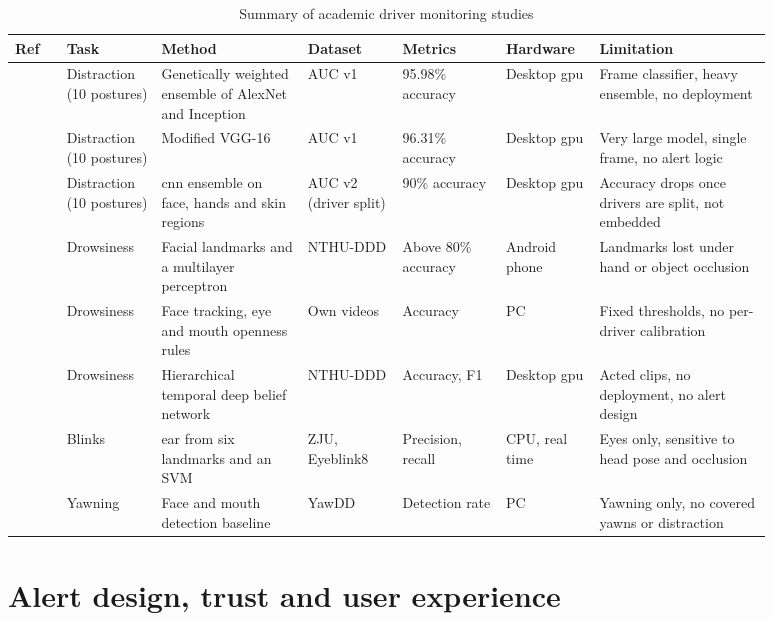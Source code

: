 \begin{table}[htbp]
\centering
\caption{Summary of academic driver monitoring studies}
\label{tab:ch2-01}
\footnotesize
\setlength{\tabcolsep}{3pt}
\renewcommand{\arraystretch}{1.15}
\begin{tabular}{|p{0.060\linewidth}|p{0.110\linewidth}|p{0.170\linewidth}|p{0.115\linewidth}|p{0.120\linewidth}|p{0.105\linewidth}|p{0.205\linewidth}|}
\hline
\textbf{Ref} & \textbf{Task} & \textbf{Method} & \textbf{Dataset} & \textbf{Metrics} & \textbf{Hardware} & \textbf{Limitation} \\
\hline
\cite{r32} & Distraction (10 postures) & Genetically weighted ensemble of AlexNet and Inception & AUC v1 & 95.98\% accuracy & Desktop \gls{gpu} & Frame classifier, heavy ensemble, no deployment \\
\hline
\cite{r34} & Distraction (10 postures) & Modified VGG-16 & AUC v1 & 96.31\% accuracy & Desktop \gls{gpu} & Very large model, single frame, no alert logic \\
\hline
\cite{r33} & Distraction (10 postures) & \gls{cnn} ensemble on face, hands and skin regions & AUC v2 (driver split) & 90\% accuracy & Desktop \gls{gpu} & Accuracy drops once drivers are split, not embedded \\
\hline
\cite{r40} & Drowsiness & Facial landmarks and a multilayer perceptron & NTHU-DDD & Above 80\% accuracy & Android phone & Landmarks lost under hand or object occlusion \\
\hline
\cite{r41} & Drowsiness & Face tracking, eye and mouth openness rules & Own videos & Accuracy & PC & Fixed thresholds, no per-driver calibration \\
\hline
\cite{r37} & Drowsiness & Hierarchical temporal deep belief network & NTHU-DDD & Accuracy, F1 & Desktop \gls{gpu} & Acted clips, no deployment, no alert design \\
\hline
\cite{r35} & Blinks & \gls{ear} from six landmarks and an SVM & ZJU, Eyeblink8 & Precision, recall & CPU, real time & Eyes only, sensitive to head pose and occlusion \\
\hline
\cite{r36} & Yawning & Face and mouth detection baseline & YawDD & Detection rate & PC & Yawning only, no covered yawns or distraction \\
\hline
\end{tabular}
\end{table}

\section{Alert design, trust and user experience}

